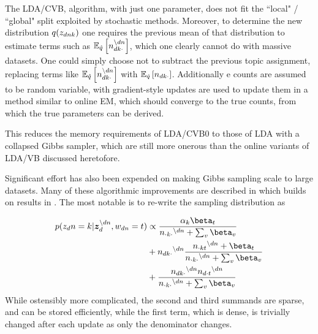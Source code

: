 The LDA/CVB, algorithm, with just one parameter, does not fit the ``local" / ``global" split exploited by stochastic methods. Moreover, to determine the new distribution $q(\zdnk)$ one requires the previous mean of that distribution to estimate terms such as $\ex{n_{dk\cdot}^{\setminus dn}}{\hat{q}}$, which one clearly cannot do with massive datasets. One could simply choose not to subtract the previous topic assignment\cite{Boyles2013}, replacing terms like $\ex{n_{dk\cdot}^{\setminus dn}}{\hat{q}}$ with $\ex{n_{dk\cdot}}{\hat{q}}$. Additionally e counts are assumed to be random variable, with gradient-style updates are used to update them in a method similar to online EM\cite{Cappe2009}, which should converge to the true counts, from which the true parameters can be derived. 

This reduces the memory requirements of LDA/CVB0 to those of LDA with a collapsed Gibbs sampler, which are still more onerous than the online variants of LDA/VB discussed heretofore. 


Significant effort has also been expended on making Gibbs sampling scale to large datasets. Many of these algorithmic improvements are described in \cite{Yao2009} which builds on results in \cite{Porteous2008}. The most notable is to re-write the sampling distribution as

\newcommand \nodn { { ^{\setminus dn } } }

\begin{align}
\begin{split}
p(z_dn = k | \vv{z}_{d}^{\setminus dn}, w_{dn}=t) & \propto \frac{\alpha_k \beta_t}{n_{\cdot k \cdot}\nodn + \sum_v \beta_v} \\
& + n_{dk\cdot}\nodn \frac{n_{\cdot kt}\nodn + \beta_t}{n_{\cdot k \cdot}\nodn + \sum_v \beta_v} \\
& + \frac{n_{dk\cdot}\nodn n_{d\cdot t}\nodn}{n_{\cdot k \cdot}\nodn + \sum_v \beta_v}
\end{split}
\end{align}
While ostensibly more complicated, the second and third summands are sparse, and can be stored efficiently, while the first term, which is dense, is trivially changed after each update as only the denominator changes.

